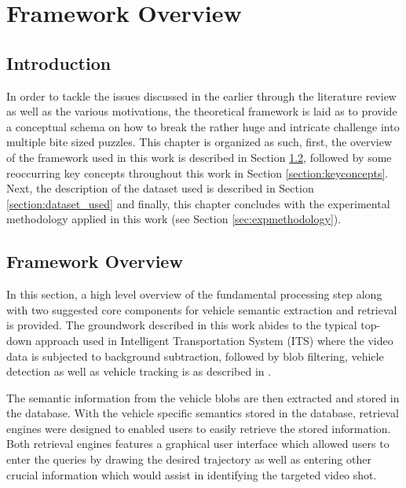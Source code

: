 \chapter{Framework Overview}

\section{Introduction}
In order to tackle the issues discussed in the earlier through the literature review as well as the various motivations, the theoretical framework is laid as to provide a conceptual schema on how to break the rather huge and intricate challenge into multiple bite sized puzzles. This chapter is organized as such, first, the overview of the framework used in this work is described in Section \ref{section:framework}, followed by some reoccurring key concepts throughout this work in Section \ref{section:keyconcepts}. Next, the description of the dataset used is described in Section \ref{section:dataset_used} and finally, this chapter concludes with the experimental methodology applied in this work (see Section \ref{sec:expmethodology}). 


\section{Framework Overview}
\label{section:framework}
In this section, a high level overview of the fundamental processing step along with two suggested core components for vehicle semantic extraction and retrieval is provided. The groundwork described in this work abides to the typical top-down approach used in Intelligent Transportation System (ITS) where the video data is subjected to background subtraction, followed by blob filtering, vehicle detection as well as vehicle tracking is as described in \cite{lim2017}. 

The semantic information from the vehicle blobs are then extracted and stored in the database. With the vehicle specific semantics stored in the database, retrieval engines were designed to enabled users to easily retrieve the stored information. Both retrieval engines features a graphical user interface which allowed users to enter the queries by drawing the desired trajectory as well as entering other crucial information which would assist in identifying the targeted video shot.


